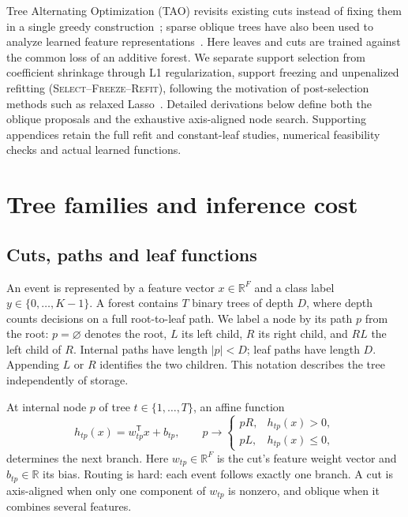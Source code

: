\documentclass[11pt,a4paper]{article}
\newcommand{\SFR}{\textsc{Select--Freeze--Refit}}
\begin{document}
Tree Alternating Optimization (TAO) revisits existing cuts instead of fixing
them in a single greedy construction~\cite{tao2018}; sparse oblique trees have
also been used to analyze learned feature representations~\cite{tao2021}.
Here leaves and cuts are trained against the common loss of an additive forest.
We separate support selection from coefficient shrinkage through L1
regularization, support freezing and unpenalized refitting (\SFR{}), following
the motivation of post-selection methods such as relaxed Lasso~\cite{relaxed}.
Detailed derivations below define both the oblique proposals and the exhaustive
axis-aligned node search. Supporting appendices retain the full refit and
constant-leaf studies, numerical feasibility checks and actual learned functions.

\section{Tree families and inference cost}
\label{sec:architecture}
\subsection{Cuts, paths and leaf functions}
An event is represented by a feature vector $x\in\mathbb R^F$ and a class
label $y\in\{0,\ldots,K-1\}$. A forest contains $T$ binary trees of depth $D$,
where depth counts decisions on a full root-to-leaf path. We label a node by
its path $p$ from the root: $p=\varnothing$ denotes the root, $L$ its left
child, $R$ its right child, and $RL$ the left child of $R$. Internal paths
have length $|p|<D$; leaf paths have length $D$. Appending $L$ or $R$ identifies
the two children. This notation describes the tree independently of storage.

At internal node $p$ of tree $t\in\{1,\ldots,T\}$, an affine function
\begin{equation}
 h_{tp}(x)=w_{tp}^{\mathsf T}x+b_{tp},\qquad
 p\longrightarrow\begin{cases}pR,&h_{tp}(x)>0,\\pL,&h_{tp}(x)\leq0,\end{cases}
 \label{eq:cut}
\end{equation}
determines the next branch. Here $w_{tp}\in\mathbb R^F$ is the cut's feature
weight vector and $b_{tp}\in\mathbb R$ its bias. Routing is hard: each event
follows exactly one branch. A cut is axis-aligned when only one component of
$w_{tp}$ is nonzero, and oblique when it combines several features.
\end{document}
